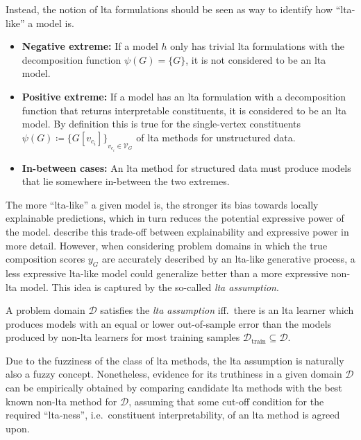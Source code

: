 Instead, the notion of \ac{lta} formulations should be seen as way to identify how ``\acs{lta}-like'' a model is.
\begin{itemize}
	\item \textbf{Negative extreme:}
		If a model $h$ only has trivial \ac{lta} formulations with the decomposition function $\psi(G) = \{ G \}$, it is not considered to be an \ac{lta} model.
	\item \textbf{Positive extreme:}
		If a model has an \ac{lta} formulation with a decomposition function that returns interpretable constituents, it is considered to be an \ac{lta} model.
		By definition this is true for the single-vertex constituents $\psi(G) \coloneqq {\{ G[v_{c_i}] \}}_{v_{c_i} \in \mathcal{V}_G}$ of \ac{lta} methods for unstructured data.
	\item \textbf{In-between cases:}
		An \ac{lta} method for structured data must produce models that lie somewhere in-between the two extremes.
\end{itemize}

The more ``\acs{lta}-like'' a given model is, the stronger its bias towards locally explainable predictions, which in turn reduces the potential expressive power of the model.
\citet{Gilpin2018} describe this trade-off between explainability and expressive power in more detail.
However, when considering problem domains in which the true composition scores $y_G$ are accurately described by an \acs{lta}-like generative process, a less expressive \ac{lta}-like model could generalize better than a more expressive non-\ac{lta} model.
This idea is captured by the so-called \textit{\ac{lta} assumption}.
\begin{defn}\label{defn:ltag:lta-assumption}
	A problem domain $\mathcal{D}$ satisfies the \textit{\ac{lta} assumption} iff.\ there is an \ac{lta} learner which produces models with an equal or lower out-of-sample error than the models produced by non-\acs{lta} learners for most training samples $\mathcal{D}_{\mathrm{train}} \subseteq \mathcal{D}$.
\end{defn}
Due to the fuzziness of the class of \ac{lta} methods, the \ac{lta} assumption is naturally also a fuzzy concept.
Nonetheless, evidence for its truthiness in a given domain $\mathcal{D}$ can be empirically obtained by comparing candidate \ac{lta} methods with the best known non-\ac{lta} method for $\mathcal{D}$, assuming that some cut-off condition for the required ``\ac{lta}-ness'', i.e.\ constituent interpretability, of an \ac{lta} method is agreed upon.


